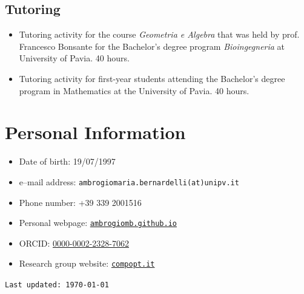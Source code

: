 \documentclass[11pt,a4paper]{article}
\begin{document}
\subsection*{Tutoring}
\begin{itemize}[,align=left, labelwidth=!]
    \item[\texttt{2021/2022}] Tutoring activity for the course \emph{Geometria e Algebra} that was held by prof. Francesco Bonsante for the Bachelor’s degree program \emph{Bioingegneria} at University of Pavia. 40 hours.
    \item[\texttt{2021/2022}] Tutoring activity for first-year students attending the Bachelor’s degree program in Mathematics at the University of Pavia. 40 hours.
\end{itemize}
\section*{Personal Information}
\begin{itemize}[leftmargin=0pt]
    \item[] Date of birth: 19/07/1997
    \item[] e--mail address: \texttt{ambrogiomaria.bernardelli(at)unipv.it}
    \item[] Phone number: +39 339 2001516
    \item[] Personal webpage: \href{https://ambrogiomb.github.io/}{\texttt{ambrogiomb.github.io}}
    \item[] ORCID: \href{https://orcid.org/0000-0002-2328-7062}{0000-0002-2328-7062}
    \item[] Research group website: \href{https://www.compopt.it/}{\texttt{compopt.it}}
\end{itemize}
\vfill
\begin{center}
    \small\texttt{Last updated: \today}
\end{center}
\end{document}
